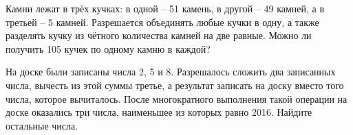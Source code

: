 \begin{problems}
    
    
    
 
    \item Камни лежат в трёх кучках: в одной – 51 камень, в другой – 49 камней, а в третьей – 5 камней. Разрешается объединять любые кучки в одну, а также разделять кучку из чётного количества камней на две равные. Можно ли получить 105 кучек по одному камню в каждой? 
      
	\item На доске были записаны числа 2, 5 и 8. Разрешалось сложить два записанных числа, вычесть из этой суммы третье, а результат записать на доску вместо того числа, которое вычиталось. После многократного выполнения такой операции на доске оказались три числа, наименьшее из которых равно 2016. Найдите остальные числа.

\end{problems}